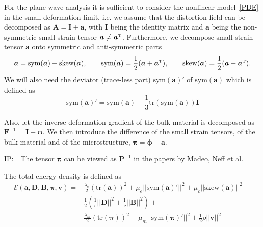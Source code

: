 \documentclass[
10pt, %
a4paper, %
oneside, %
headinclude,footinclude, %
BCOR5mm, %
table,
]{scrartcl}
\newcommand{\Id}{\bm{I}}
\newcommand{\vv}{\bm{v}}
\newcommand{\calE}{\mathcal{E}}						%
\newcommand{\IP}[1]{{\color{Red}IP:\ \ #1}}
\newcommand{\Dist}{ \bm{A} }	%
\newcommand{\Burg}{ \bm{B} }	%
\newcommand{\Durg}{ \bm{D} }	%
\newcommand{\Distsmall}{ \bm{a} }	%
\newcommand{\Plastsmall}{ \bm{\pi} }	%
\newcommand{\Defgrad}{ \bm{F} }
\newcommand{\symA}{\text{sym}(\bm{a})}
\newcommand{\skewA}{\text{skew}(\bm{a})}
\newcommand{\symP}{\text{sym}(\bm{\Plastsmall})}
\newcommand{\transpose}{{\mathrm {\mathsmaller T}}}
\newcommand{\tr}{\text{tr}}
\begin{document}
For the plane-wave analysis it is sufficient to consider the nonlinear model~\eqref{PDE} in the 
small deformation limit, i.e. we assume that the distortion field can be decomposed as $ \Dist = 
\bm{I} + \Distsmall $, with $ \bm{I} $ being the identity matrix and $ \Distsmall $ being the 
non-symmetric small strain tensor $ \Distsmall \neq \Distsmall^\transpose $. Furthermore, we 
decompose small strain tensor $ \Distsmall $ onto symmetric and anti-symmetric parts
\begin{equation}
	\Distsmall = \symA + \skewA, \qquad 
	\symA = \frac{1}{2}(\Distsmall + \Distsmall^\transpose), \qquad
	\skewA = \frac{1}{2} (\Distsmall - \Distsmall^\transpose).
\end{equation}
We will also need the deviator (trace-less part) $ \symA' $ of $ \symA $ which is defined as
\begin{equation}
\symA' = \symA - \frac{1}{3}\tr(\symA)\bm{I}
\end{equation}

Also, let the inverse deformation gradient of the bulk material is decomposed as $ \Defgrad^{-1} = 
\Id + \bm{\phi}$. We then introduce the difference of the small strain tensors, of the bulk 
material and 
of the microstructure,  $ \Plastsmall = \bm{\phi} - \Distsmall $.

\IP{The tensor $ \Plastsmall $ can be viewed as $ \bm{P}^{-1} $ in the papers by Madeo, Neff et al.}

The total energy density is defined as
\begin{align}
\calE(\Distsmall,\Durg,\Burg,\Plastsmall,\vv) = &\frac{\lambda_e}{2}(\tr(\Distsmall))^2 + \mu_e 
||\symA'||^2 + 
\mu_c 
||\skewA||^2 + \nonumber\\
&\frac{1}{2}\left (\frac{1}{\epsilon} ||\Durg||^2+ \frac{1}{\nu}||\Burg||^2\right) + 
\nonumber\\
&\frac{\lambda_m}{2}(\tr(\Plastsmall))^2 + \mu_m 
||\symP'||^2 + \frac{1}{2}\rho ||\vv||^2
\end{align}
\end{document}
